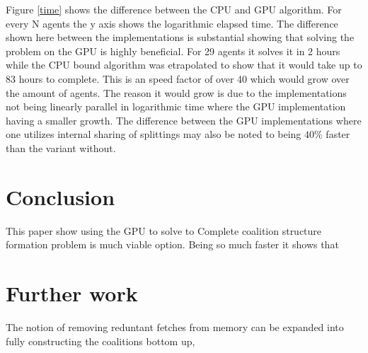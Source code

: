 \documentclass{aamas2012}
\begin{document}
Figure \ref{time} shows the difference between the CPU and GPU algorithm.
For every N agents the y axis shows the logarithmic elapsed time. The difference shown here between the implementations is substantial showing
that solving the problem on the GPU is highly beneficial. For 29 agents it solves it in 2 hours while the CPU bound algorithm was etrapolated to show that it would take up to 83 hours to complete. This is an speed factor of over 40 which would grow over the amount of agents. The reason it would grow is due to the implementations not being linearly parallel in logarithmic time where the GPU implementation having a smaller growth.
The difference between the GPU implementations where one utilizes internal 
sharing of splittings may also be noted to being $40\%$ faster than the variant without.
\section{Conclusion}
This paper show using the GPU to solve to Complete coalition structure formation problem is much viable option. 
Being so much faster it shows that

\section{Further work}
The notion of removing reduntant fetches from memory can be expanded into fully constructing the coalitions bottom up,
% 
\end{document}
